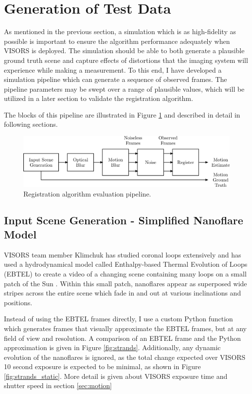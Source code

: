 \documentclass[tocnosub,noragright,centerchapter,12pt]{uiucecethesis09}
\begin{document}
\section{Generation of Test Data} \label{sec:pipeline}

As mentioned in the previous section, a simulation which is as high-fidelity as possible is important to ensure the algorithm performance adequately when VISORS is deployed.  The simulation should be able to both generate a plausible ground truth scene and capture effects of distortions that the imaging system will experience while making a measurement.  To this end, I have developed a simulation pipeline which can generate a sequence of observed frames.  The pipeline parameters may be swept over a range of plausible values, which will be utilized in a later section to validate the registration algorithm.

The blocks of this pipeline are illustrated in Figure \ref{fig:pipeline} and described in detail in following sections.

\begin{figure}
  \centering
  \includegraphics[width=1\textwidth]{figures/pipeline.png}
  \caption{Registration algorithm evaluation pipeline.}
  \label{fig:pipeline}
\end{figure}

\subsection{Input Scene Generation - Simplified Nanoflare Model} \label{sec:scene_nanoflare}

VISORS team member Klimchuk has studied coronal loops extensively and has used a hydrodynamical model called Enthalpy-based Thermal Evolution of Loops (EBTEL) to create a video of a changing scene containing many loops on a small patch of the Sun \cite{klimchuk2008}.  Within this small patch, nanoflares appear as superposed wide stripes across the entire scene which fade in and out at various inclinations and positions.

Instead of using the EBTEL frames directly, I use a custom Python function which generates frames that visually approximate the EBTEL frames, but at any field of view and resolution.  A comparison of an EBTEL frame and the Python approximation is given in Figure \ref{fig:strands}.  Additionally, any dynamic evolution of the nanoflares is ignored, as the total change expected over VISORS 10 second exposure is expected to be minimal, as shown in Figure \ref{fig:strands_static}.  More detail is given about VISORS exposure time and shutter speed in section \ref{sec:motion}
\end{document}
